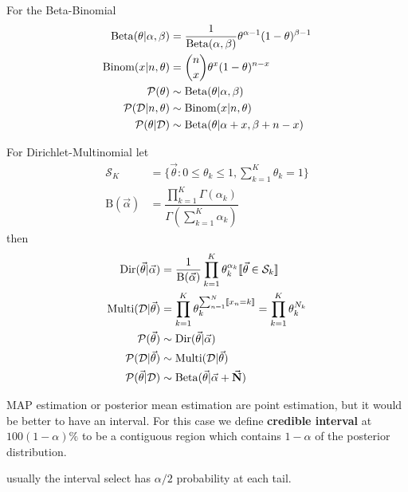 \documentclass[../../main.tex]{subfiles}
\begin{document}
For the Beta-Binomial
\begin{align*}
    \mathrm{Beta}(\theta|\alpha,\beta)&= \dfrac{1}{\mathrm{Beta}(\alpha,\beta)}\theta^{\alpha-1}(1-\theta)^{\beta-1}\\
    \mathrm{Binom}(x|n,\theta)&= \binom{n}{x}\theta^x(1-\theta)^{n-x}\\
    \mathcal{P}(\theta) &\sim \mathrm{Beta}(\theta|\alpha,\beta)\\
    \mathcal{P}(\mathcal{D}|n,\theta) &\sim \mathrm{Binom}(x|n,\theta)\\
    \mathcal{P}(\theta|\mathcal{D}) &\sim \mathrm{Beta}(\theta|\alpha+x,\beta+n-x)
\end{align*}

For Dirichlet-Multinomial let
\begin{align*}
    \mathcal{S}_K&= \{ \vec{\theta} : 0\le\theta_k\le1, \sum_{k=1}^K \theta_k = 1 \}\\
    \mathrm{B}(\vec{\alpha})&= \dfrac{\prod_{k=1}^K\Gamma(\alpha_k)}{\Gamma(\sum_{k=1}^K \alpha_k)}
\end{align*}
then
\begin{align*}
    \mathrm{Dir}(\vec{\theta}|\vec{\alpha})&= \dfrac{1}{\mathrm{B}(\vec{\alpha})}\prod_{k=1}^K \theta_k^{\alpha_k} \indicator{\vec{\theta}\in\mathcal{S}_k}\\
    \mathrm{Multi}(\D|\vec{\theta})&= \prod_{k=1}^K \theta_k^{\sum_{n=1}^N \indicator{x_n=k}}=\prod_{k=1}^K \theta_k^{N_k}\\
    \p(\vec{\theta}) &\sim \mathrm{Dir}(\vec{\theta}|\vec{\alpha})\\
    \p(\D|\vec{\theta}) &\sim \mathrm{Multi}(\D|\vec{\theta})\\
    \p(\vec{\theta}|\D) &\sim \mathrm{Beta}(\vec{\theta}|\vec{\alpha}+\vec{N})
\end{align*}

MAP estimation or posterior mean estimation are point estimation, but it would be better to have an interval. For this case we define \textbf{credible interval} at $100(1-\alpha)\%$ to be a contiguous region which contains $1-\alpha$ of the posterior distribution.
\begin{figure}[H]
    \centering
\end{figure}
usually the interval select has $\alpha/2$ probability at each tail.
\end{document}
